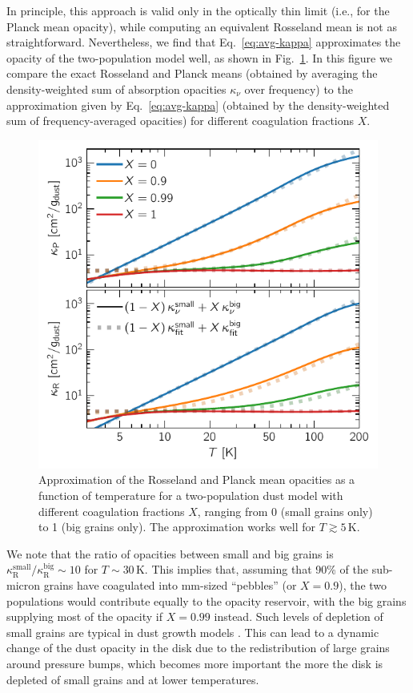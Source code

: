 \documentclass[fleqn,usenatbib,useAMS]{mnras}
\newcommand{\kappaR}{\kappa_\mathrm{R}}
\begin{document}
In principle, this approach is valid only in the optically thin limit (i.e., for the Planck mean opacity), while computing an equivalent Rosseland mean is not as straightforward. Nevertheless, we find that Eq.~\eqref{eq:avg-kappa} approximates the opacity of the two-population model well, as shown in Fig.~\ref{fig:opacity-approximation}. In this figure we compare the exact Rosseland and Planck means (obtained by averaging the density-weighted sum of absorption opacities $\kappa_\nu$ over frequency) to the approximation given by Eq.~\eqref{eq:avg-kappa} (obtained by the density-weighted sum of frequency-averaged opacities) for different coagulation fractions $X$. 
%
\begin{figure}
	\centering
	\includegraphics[width=\columnwidth]{opacities-fit.pdf}
	\caption{Approximation of the Rosseland and Planck mean opacities as a function of temperature for a two-population dust model with different coagulation fractions $X$, ranging from 0 (small grains only) to 1 (big grains only). The approximation works well for $T\gtrsim5$\,K.}
	\label{fig:opacity-approximation}
\end{figure}

We note that the ratio of opacities between small and big grains is $\kappaR^\text{small}/\kappaR^\text{big}\sim 10$ for $T\sim 30$\,K. This implies that, assuming that 90\% of the sub-micron grains have coagulated into mm-sized ``pebbles'' (or $X=0.9$), the two populations would contribute equally to the opacity reservoir, with the big grains supplying most of the opacity if $X=0.99$ instead. Such levels of depletion of small grains are typical in dust growth models \citep{birnstiel-2023}. This can lead to a dynamic change of the dust opacity in the disk due to the redistribution of large grains around pressure bumps, which becomes more important the more the disk is depleted of small grains and at lower temperatures.
\end{document}
